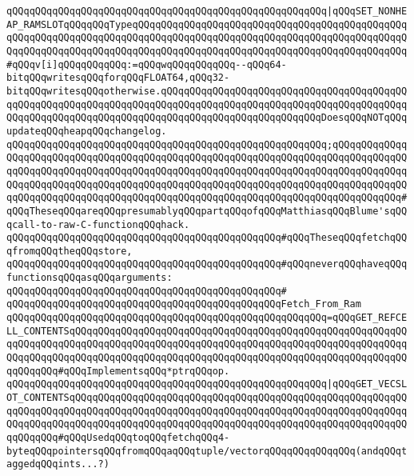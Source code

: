 \newline
\verb|qQQqqQQqqQQqqQQqqQQqqQQqqQQqqQQqqQQqqQQqqQQqqQQqqQQqqQQq|\verb#|qQQqSET_NONHEAP_RAMSLOTqQQqqQQqTypeqQQqqQQqqQQqqQQqqQQqqQQqqQQqqQQqqQQqqQQqqQQqqQQqqQQqqQQqqQQqqQQqqQQqqQQqqQQqqQQqqQQqqQQqqQQqqQQqqQQqqQQqqQQqqQQqqQQqqQQqqQQqqQQqqQQqqQQqqQQqqQQqqQQqqQQqqQQqqQQqqQQqqQQqqQQqqQQqqQQqqQQqqQQq#\verb|#qQQqv[i]qQQqqQQqqQQq:=qQQqwqQQqqQQqqQQq--qQQq64-bitqQQqwritesqQQqforqQQqFLOAT64,qQQq32-bitqQQqwritesqQQqotherwise.qQQqqQQqqQQqqQQqqQQqqQQqqQQqqQQqqQQqqQQqqQQqqQQqqQQqqQQqqQQqqQQqqQQqqQQqqQQqqQQqqQQqqQQqqQQqqQQqqQQqqQQqqQQqqQQqqQQqqQQqqQQqqQQqqQQqqQQqqQQqqQQqqQQqqQQqqQQqqQQqqQQqqQQqDoesqQQqNOTqQQqupdateqQQqheapqQQqchangelog.|\newline
\verb|qQQqqQQqqQQqqQQqqQQqqQQqqQQqqQQqqQQqqQQqqQQqqQQqqQQqqQQq;qQQqqQQqqQQqqQQqqQQqqQQqqQQqqQQqqQQqqQQqqQQqqQQqqQQqqQQqqQQqqQQqqQQqqQQqqQQqqQQqqQQqqQQqqQQqqQQqqQQqqQQqqQQqqQQqqQQqqQQqqQQqqQQqqQQqqQQqqQQqqQQqqQQqqQQqqQQqqQQqqQQqqQQqqQQqqQQqqQQqqQQqqQQqqQQqqQQqqQQqqQQqqQQqqQQqqQQqqQQqqQQqqQQqqQQqqQQqqQQqqQQqqQQqqQQqqQQqqQQqqQQqqQQqqQQqqQQqqQQqqQQqqQQqqQQq#qQQqTheseqQQqareqQQqpresumablyqQQqpartqQQqofqQQqMatthiasqQQqBlume'sqQQqcall-to-raw-C-functionqQQqhack.|\newline
\newline
\verb|qQQqqQQqqQQqqQQqqQQqqQQqqQQqqQQqqQQqqQQqqQQqqQQq#qQQqTheseqQQqfetchqQQqfromqQQqtheqQQqstore,|\newline
\verb|qQQqqQQqqQQqqQQqqQQqqQQqqQQqqQQqqQQqqQQqqQQqqQQq#qQQqneverqQQqhaveqQQqfunctionsqQQqasqQQqarguments:|\newline
\verb|qQQqqQQqqQQqqQQqqQQqqQQqqQQqqQQqqQQqqQQqqQQqqQQq#|\newline
\verb|qQQqqQQqqQQqqQQqqQQqqQQqqQQqqQQqqQQqqQQqqQQqqQQqFetch_From_Ram|\newline
\verb|qQQqqQQqqQQqqQQqqQQqqQQqqQQqqQQqqQQqqQQqqQQqqQQqqQQqqQQq=qQQqGET_REFCELL_CONTENTSqQQqqQQqqQQqqQQqqQQqqQQqqQQqqQQqqQQqqQQqqQQqqQQqqQQqqQQqqQQqqQQqqQQqqQQqqQQqqQQqqQQqqQQqqQQqqQQqqQQqqQQqqQQqqQQqqQQqqQQqqQQqqQQqqQQqqQQqqQQqqQQqqQQqqQQqqQQqqQQqqQQqqQQqqQQqqQQqqQQqqQQqqQQqqQQqqQQqqQQqqQQqqQQq#qQQqImplementsqQQq*ptrqQQqop.|\newline
\verb|qQQqqQQqqQQqqQQqqQQqqQQqqQQqqQQqqQQqqQQqqQQqqQQqqQQqqQQq|\verb#|qQQqGET_VECSLOT_CONTENTSqQQqqQQqqQQqqQQqqQQqqQQqqQQqqQQqqQQqqQQqqQQqqQQqqQQqqQQqqQQqqQQqqQQqqQQqqQQqqQQqqQQqqQQqqQQqqQQqqQQqqQQqqQQqqQQqqQQqqQQqqQQqqQQqqQQqqQQqqQQqqQQqqQQqqQQqqQQqqQQqqQQqqQQqqQQqqQQqqQQqqQQqqQQqqQQqqQQqqQQqqQQqqQQq#\verb|#qQQqUsedqQQqtoqQQqfetchqQQq4-byteqQQqpointersqQQqfromqQQqaqQQqtuple/vectorqQQqqQQqqQQqqQQq(andqQQqtaggedqQQqints...?)|\newline
